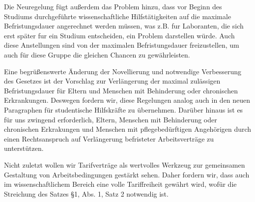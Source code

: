 Die Neuregelung fügt außerdem das Problem hinzu, dass vor Beginn des Studiums durchgeführte wissenschaftliche Hilfstätigkeiten auf die maximale Befristungsdauer angerechnet werden müssen, was z.B. fur Laboranten, die sich erst später fur ein Studium entscheiden, ein Problem darstellen würde.
Auch diese Anstellungen sind von der maximalen Befristungsdauer freizustellen, um auch für diese Gruppe die gleichen Chancen zu gewährleisten.

Eine begrüßenswerte Änderung der Novellierung und notwendige Verbesserung des Gesetzes ist der Vorschlag zur Verlängerung der maximal zulässigen Befristungsdauer für Eltern und Menschen mit Behinderung oder chronischen Erkrankungen. Deswegen fordern wir, diese Regelungen analog auch in den neuen Paragraphen für studentische Hilfskräfte zu übernehmen. 
Darüber hinaus ist es für uns zwingend erforderlich, Eltern, Menschen mit Behinderung oder chronischen Erkrakungen und Menschen mit pflegebedürftigen Angehörigen durch einen Rechtsanspruch auf Verlängerung befristeter Arbeitsverträge zu unterstützen.

Nicht zuletzt wollen wir Tarifverträge als wertvolles Werkzeug zur gemeinsamen Gestaltung von Arbeitsbedingungen gestärkt sehen. Daher fordern wir, dass auch im wissenschaftlichem Bereich eine volle Tariffreiheit gewährt wird, wofür die Streichung des Satzes §1, Abs. 1, Satz 2 notwendig ist.
